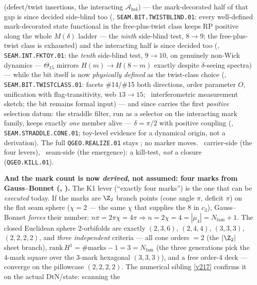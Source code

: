 (defect/twist insertions, the interacting $\mathcal A_{\mathrm{hol}}$) --- the mark-decorated
half of that gap is since decided side-blind too
(, \texttt{SEAM.BIT.TWISTBLIND.01}: every well-defined
mark-decorated state functional in the free-plus-twist class keeps RP positive along the whole
$M(\delta)$ ladder --- the \emph{ninth} side-blind test, $8\to9$; the free-plus-twist class is
exhausted) and the interacting half is since decided too
(, \texttt{SEAM.INT.FKTOY.01}: the \emph{tenth}
side-blind test, $9\to10$, on genuinely non-Wick dynamics --- $\Theta_{15}$ mirrors
$H(m)\to H(8-m)$ exactly despite $\delta$-seeing spectra) --- while the bit itself is now
\emph{physically defined} as the twist-class choice
(, \texttt{SEAM.BIT.TWISTCLASS.01}: facets
\#14/\#15 both directions, order parameter $O$, unification with flag-transitivity, web
$13\to15$; \mC\ interferometric measurement sketch; the bit remains formal input) --- and since
carries the first \emph{positive} selection datum: the straddle filter, run as a selector on the
interacting mark family, keeps exactly \emph{one} member alive --- $\delta=\pi/2$ with positive
coupling (, \texttt{SEAM.STRADDLE.CONE.01}; toy-level
evidence for a dynamical origin, not a derivation).
The full \texttt{QGEO.REALIZE.01} stays \mO;
no marker moves. \mE\ carrier-side (the four
levers), \mO\ seam-side (the emergence): a kill-test, \emph{not} a closure (\texttt{QGEO.KILL.01}).
\par\smallskip\noindent\textbf{And the mark count is now \emph{derived}, not assumed: four marks from
Gauss--Bonnet (, ).} The K1 lever
(``exactly four marks'') is the one that can be \emph{executed} today. If the marks are $\Z_2$ branch points
(cone angle $\pi$, deficit $\pi$) on the flat seam sphere ($\chi{=}2$ --- the same $\chi$ that supplies the
$8$ in $c_3$), Gauss--Bonnet \emph{forces} their number: $n\pi=2\pi\chi=4\pi\Rightarrow
n=2\chi=4=|\mu_4|=N_{\mathrm{fam}}{+}1$. The closed Euclidean sphere $2$-orbifolds are exactly
$(2,3,6)$, $(2,4,4)$, $(3,3,3)$, $(2,2,2,2)$, and \emph{three independent} criteria --- all cone orders $=2$ (the
$|\Z_2|$ sheet branch), $\mathrm{rank}\,H^1=\#\text{marks}-1=3=N_{\mathrm{fam}}$ (the three generations pick
the $4$-mark square over the $3$-mark hexagonal $(3,3,3)$), and a free order-$4$ deck --- converge on the
pillowcase $(2,2,2,2)$. The numerical sibling \vref{v217} confirms it on the actual DtN/state: scanning the
